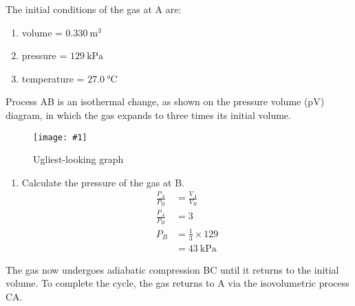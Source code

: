 \documentclass[a4paper,12pt]{article}
\newcommand{\img}[4]{\begin{center}
  \begin{figure}[H]
    \centering
    \texttt{[image: \#1]}
    \caption{#3}
    \label{fig:#4}
  \end{figure}
\end{center}}
\begin{document}
The initial conditions of the gas at A are:
\begin{center}
  \begin{enumerate}[label={}]
    \item volume = $\SI{0.330}{\meter\cubed}$
    \item pressure = $\SI{129}{\kilo\pascal}$
    \item temperature = $\SI{27.0}{\degreeCelsius}$
  \end{enumerate}
\end{center}

Process AB is an isothermal change, as shown on the pressure volume (pV) diagram, in which the gas expands to three times its initial volume.

\img{ex/9.png}{0.6}{Ugliest-looking graph}{ex9}

\begin{enumerate}[label=(\alph*)]
  \item Calculate the pressure of the gas at B.
        \begin{align*}
          \frac{P_A}{P_B} & = \frac{V_A}{V_B}        \\
          \frac{P_A}{P_B} & = 3                      \\
          P_B             & = \frac{1}{3} \times 129 \\
                          & = \qty{43}{\kilo\pascal}
        \end{align*}


\end{enumerate}

The gas now undergoes adiabatic compression BC until it returns to the initial volume. To complete the cycle, the gas returns to A via the isovolumetric process CA.
\end{document}
